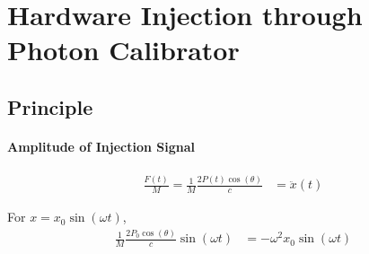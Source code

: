 
\chapter{Hardware Injection through Photon Calibrator}
\section{Principle}
 
 
 

%
%
%
%
%
%
%


\subsubsection{Amplitude of Injection Signal}


\begin{align}
    \frac{F(t)}{M}=\frac{1}{M} \frac{2 P(t) \cos(\theta)}{c} &= \ddot{x}(t)
\end{align}

For $x=x_0 \sin(\omega t)$,
\begin{align}
    \frac{1}{M} \frac{2 P_0 \cos(\theta)}{c} \sin(\omega t) &=  -\omega^2 x_0 \sin(\omega t)
\end{align}

